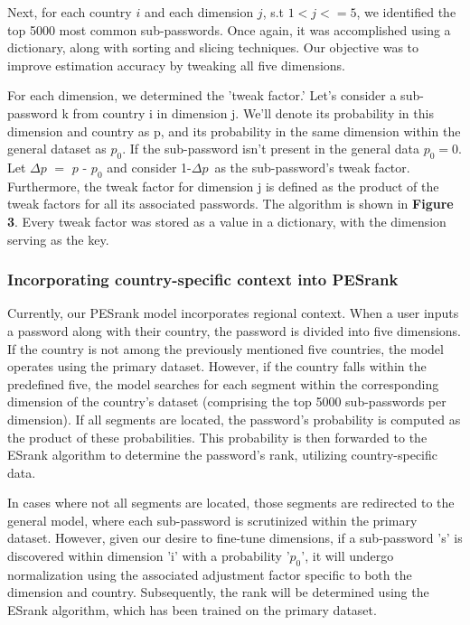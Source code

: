 \documentclass[5p,twocolumn]{elsarticle}
\begin{document}
Next, for each country \( i \) and each dimension \(j\), s.t \(1<j<=5\), we identified the top 5000 most common sub-passwords. Once again, it was accomplished using a dictionary, along with sorting and slicing techniques. Our objective was to improve estimation accuracy by tweaking all five dimensions. 

For each dimension, we determined the 'tweak factor.' Let's consider a sub-password k from country i in dimension j. We'll denote its probability in this dimension and country as p, and its probability in the same dimension within the general dataset as \(p_0\). If the sub-password isn't present in the general data \(p_0=0\). Let \(\Delta\)\(p\) \(=\) \(p\) - \(p_0\) and consider 1-\(\Delta\)\(p\)\ as the sub-password's tweak factor. Furthermore, the tweak factor for dimension j is defined as the product of the tweak factors for all its associated passwords. The algorithm is shown in \textbf{Figure 3}. Every tweak factor was stored as a value in a dictionary, with the dimension serving as the key.

\subsubsection{\textbf{Incorporating country-specific context into PESrank}}
Currently, our PESrank model incorporates regional context. When a user inputs a password along with their country, the password is divided into five dimensions. If the country is not among the previously mentioned five countries, the model operates using the primary dataset. However, if the country falls within the predefined five, the model searches for each segment within the corresponding dimension of the country's dataset (comprising the top 5000 sub-passwords per dimension). If all segments are located, the password's probability is computed as the product of these probabilities. This probability is then forwarded to the ESrank algorithm to determine the password's rank, utilizing country-specific data.

In cases where not all segments are located, those segments are redirected to the general model, where each sub-password is scrutinized within the primary dataset. However, given our desire to fine-tune dimensions, if a sub-password 's' is discovered within dimension 'i' with a probability '\(p_0\)', it will undergo normalization using the associated adjustment factor specific to both the dimension and country. Subsequently, the rank will be determined using the ESrank algorithm, which has been trained on the primary dataset. 
\end{document}
